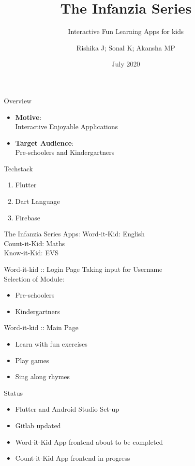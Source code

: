 \documentclass[14pt]{beamer}
\title[SlideSpeak]{The Infanzia Series}
\subtitle{Interactive Fun Learning Apps for kids}
\author[Team 16]{Rishika J; Sonal K; Akansha MP}
\date{July 2020}
\begin{document}
\begin{frame}
    \titlepage
\end{frame}

\begin{frame}{Overview}
    \pause
    \begin{itemize}
    \item \textbf{Motive}: \\
            Interactive Enjoyable Applications
        \pause
    \item \textbf{Target Audience}: \\
            Pre-schoolers and Kindergartners
    \end{itemize}
\end{frame}

\begin{frame}{Techstack}
    \pause
    \begin{enumerate}
        \item Flutter
        \item Dart Language
        \item Firebase  
    \end{enumerate}
\end{frame}

\begin{frame}[standout]
    The Infanzia Series Apps: 
    \pause
    \alert{Word-it-Kid: English} \\
    \pause
    \alert{Count-it-Kid: Maths} \\
    \pause
    \alert{Know-it-Kid: EVS} 
\end{frame}

\begin{frame}{Word-it-kid :: Login Page}
    Taking input for Username \\
    Selection of Module: \\
    \begin{itemize}
        \item Pre-schoolers
        \item Kindergartners
    \end{itemize}
\end{frame}

\begin{frame}{Word-it-kid :: Main Page}
    \begin{itemize}
        \item Learn with fun exercises \\
        \item Play games \\
        \item Sing along rhymes
    \end{itemize}
\end{frame}

\begin{frame}{Status}
    \begin{itemize}
        \item Flutter and Android Studio Set-up
        \item Gitlab updated
        \item Word-it-Kid App frontend about to be completed
        \item Count-it-Kid App frontend in progress
    \end{itemize}
\end{frame}
\end{document}

